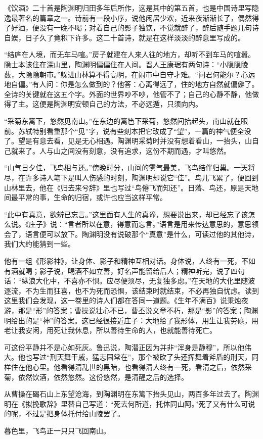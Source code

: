 \begin{appreciation}
《饮酒》二十首是陶渊明归田多年后所作，这是其中的第五首，也是中国诗里写隐逸最著名的篇章之一。诗前有一段小序，说他闲居少欢，近来夜渐渐长了，偶然得了好酒，便没有一晚不喝；对着自己的影子独饮，不觉就醉了，醉后随手题几句诗自娱，日子久了竟积下许多。这二十首诗，就是在这样淡淡的醉意里写成的。

“结庐在人境，而无车马喧。”房子就建在人来人往的地方，却听不到车马的喧嚣。隐士本该住在深山里，陶渊明偏偏住在人间。晋人王康琚有两句诗：“小隐隐陵薮，大隐隐朝市。”躲进山林算不得高明，在闹市中自守才难。“问君何能尔？心远地自偏。”有人问：你是怎么做到的？他答：心离得远了，住的地方自然就偏僻了。全诗的关键就在这五个字。外面的世界吵不吵，他管不了；自己的心静不静，他做得了主。这便是陶渊明安顿自己的方法，不必远遁，只须向内。

“采菊东篱下，悠然见南山。”在东边的篱笆下采菊，悠然间抬起头，南山就在眼前。苏轼特别看重那个“见”字，说有些刻本把它改成了“望”，一篇的神气便全没了。望是有意去看，见是无心相遇。陶渊明采菊时并没有想着看山，一抬头，山自己就来了。人与山之间没有刻意，没有追求，这份不期而遇，才叫悠然。

“山气日夕佳，飞鸟相与还。”傍晚时分，山间的雾气最美，飞鸟结伴归巢。一天将尽，在许多诗人笔下是叫人伤感的时刻，陶渊明却说它“佳”。鸟儿飞累了，便回到山林里去，他在《归去来兮辞》里也写过“鸟倦飞而知还”。日落、鸟还，原是天地间最平常的事，生命的归宿，或许也应当这样平常。

“此中有真意，欲辨已忘言。”这里面有人生的真谛，想要说出来，却已经忘了该怎么说。《庄子》说：“言者所以在意，得意而忘言。”语言是用来传达意思的，意思领会了，语言便可以放下。陶渊明没有说破那个“真意”是什么，可读过他的其他诗，我们大约能猜到一些。

他有一组《形影神》，让身体、影子和精神互相对话。身体说，人终有一死，不如有酒就喝；影子说，喝酒不如立善，好名声能留给后人；精神听完，说了四句话：“纵浪大化中，不喜亦不惧。应尽便须尽，无复独多虑。”在天地的大化里随波逐流，不为生而狂喜，也不为死而恐惧，该结束时就结束，不必再独自忧虑。读到这里我们会发现，这一卷里的诗人们都在答同一道题。《生年不满百》说秉烛夜游，那是“形”的答案；曹操说壮心不已，曹丕说文章不朽，那是“影”的答案；陶渊明给出的是“神”的答案。这已经很接近庄子：大地给了我形体，用生让我劳碌，用老让我安闲，用死让我休息，所以善待生命的人，也就能善待死亡。

可这份平静并不是心如死灰。鲁迅说，陶潜正因为并非“浑身是静穆”，所以他伟大。他也写过“刑天舞干戚，猛志固常在”，那个被砍了头还挥舞着斧盾的刑天，同样住在他心里。他看得清乱世的黑暗，也看得清人终有一死，看清之后，依然采菊，依然饮酒，依然悠然。这份悠然，是清醒之后的选择。

从曹操在碣石山上东望沧海，到陶渊明在东篱下抬头见山，两百多年过去了。陶渊明在《拟挽歌辞》里替自己写道：“死去何所道，托体同山阿。”死了又有什么可说的呢，不过是把身体托付给山陵罢了。

暮色里，飞鸟正一只只飞回南山。
\end{appreciation}
